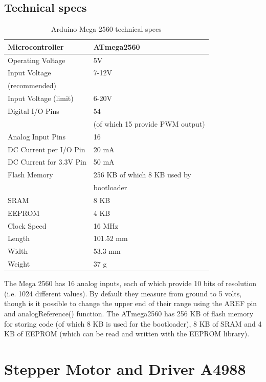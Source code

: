 \subsection{Technical specs}
\begin{table}[H]
	\centering
	\caption{Arduino Mega 2560 technical specs\cite{arduinomega_thesis}}	
	\label{tab:arduinomega2560_technical_specs}
	\begin{tabularx}{0.65\textwidth}{ll}
		\toprule
		Microcontroller & ATmega2560 \\
		\midrule
		Operating Voltage & 5V \\
		\midrule 
		Input Voltage  & 7-12V \\
		(recommended)  & \\
		\midrule
		Input Voltage (limit) & 6-20V \\
		\midrule
		Digital I/O Pins & 54 \\
			& (of which 15 provide PWM output) \\
		\midrule
		Analog Input Pins & 16 \\
		\midrule
		DC Current per I/O Pin & 20 mA \\
		\midrule
		DC Current for 3.3V Pin & 50 mA \\
		\midrule
		Flash Memory & 256 KB of which 8 KB used by \\
			& bootloader \\
		\midrule
		SRAM & 8 KB\\
		\midrule
		EEPROM & 4 KB\\
		\midrule
		Clock Speed & 16 MHz\\
		\midrule
		Length & 101.52 mm\\
		\midrule
		Width & 53.3 mm\\
		\midrule
		Weight & 37 g \\
		\bottomrule
	\end{tabularx}
\end{table}
The Mega 2560 has 16 analog inputs, each of which provide 10 bits of resolution (i.e. 1024 different values). By default they measure from ground to 5 volts, though is it possible to change the upper end of their range using the AREF pin and analogReference() function.
The ATmega2560 has 256 KB of flash memory for storing code (of which 8 KB is used for the bootloader), 8 KB of SRAM and 4 KB of EEPROM (which can be read and written with the EEPROM library).
\newpage
\section{Stepper Motor and Driver A4988}
